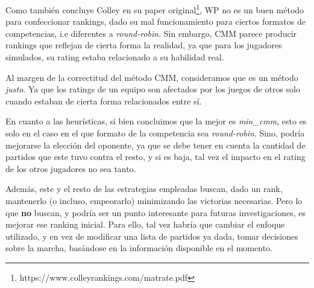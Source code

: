 \documentclass[a4paper]{article}
\begin{document}
Como también concluye Colley en su paper original\footnote{https://www.colleyrankings.com/matrate.pdf}, WP no es un buen método para confeccionar rankings, dado su mal funcionamiento para ciertos formatos de competencias, i.e diferentes a \textit{round-robin}. Sin embargo, CMM parece producir rankings que reflejan de cierta forma la realidad, ya que para los jugadores simulados, su rating estaba relacionado a su habilidad real.

Al margen de la correctitud del método CMM, consideramos que es un método \textit{justo}. Ya que los ratings de un equipo son afectados por los juegos de otros solo cuando estaban de cierta forma relacionados entre sí.

En cuanto a las heurísticas, si bien concluimos que la mejor es \textit{min\_cmm}, esto es solo en el caso en el que formato de la competencia sea \emph{round-robin}. Sino, podría mejorarse la elección del oponente, ya que se debe tener en cuenta la cantidad de partidos que este tuvo contra el resto, y si es baja, tal vez el impacto en el rating de los otros jugadores no sea tanto. 

Además, este y el resto de las estrategias empleadas buscan, dado un rank, mantenerlo (o incluso, empeorarlo) minimizando las victorias necesarias. Pero lo que \textbf{no} buscan, y podría ser un punto interesante para futuras investigaciones, es mejorar ese ranking inicial. Para ello, tal vez habría que cambiar el enfoque utilizado, y en vez de modificar una lista de partidos ya dada, tomar decisiones sobre la marcha, basándose en la información disponible en el momento.
\end{document}
